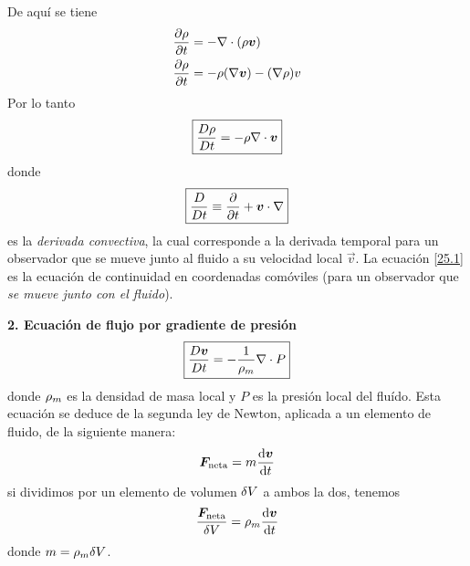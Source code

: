 De aquí se tiene
\begin{align}
  \pdv{\rho}{t}&=-\nabla\cdot (\rho\vb*{v})\\
  \pdv{\rho}{t}&=-\rho (\nabla\vb*{v})-(\nabla\rho )v
\end{align}
Por lo tanto
\begin{equation}\label{25.1}
\boxed{  \frac{D\rho }{D t}=-\rho \nabla\cdot\vb*{v}}
\end{equation}
donde 
\begin{equation}
\boxed{  \frac{D}{D t}\equiv \pdv{t}+\vb*{v}\cdot \nabla}
\end{equation}
es la \textit{derivada convectiva}, la cual corresponde a la derivada temporal para un observador que se mueve junto al fluido a su velocidad local $\vec{v}$. La ecuación \eqref{25.1} es la ecuación de continuidad en coordenadas comóviles (para un observador que \textit{se mueve junto con el fluido}).

\textbf{2. Ecuación de flujo por gradiente de presión}
\begin{equation}
\boxed{  \frac{D \vb*{v}}{D t}=-\frac{1}{\rho_m }\nabla\cdot P}
\end{equation}
donde $\rho_m$ es la densidad de masa local y $P$ es la presión local del fluído. Esta ecuación se deduce de la segunda ley de Newton, aplicada a un elemento de fluido, de la siguiente manera:
\begin{equation}
  \vb*{F}_{\rm neta}=m\dv{\vb*{v}}{t}
\end{equation}
si dividimos por un elemento de volumen $\delta V$ a ambos la dos, tenemos
\begin{equation}
  \frac{\vb*{F}_{\rm neta}}{\delta V}=\rho_m\dv{\vb*{v	}}{t}
\end{equation}
donde $m=\rho_m\delta V$.

